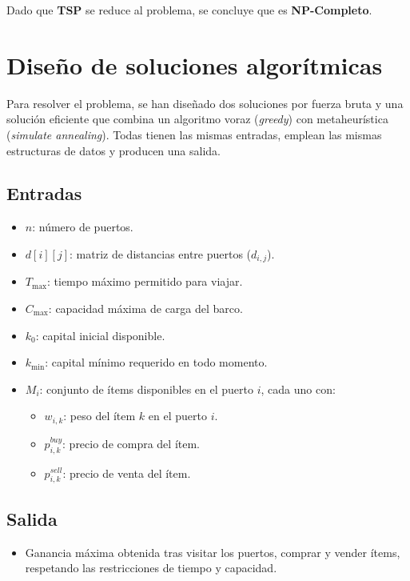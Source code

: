 \documentclass[12pt, a4paper]{article}
\begin{document}
Dado que \textbf{TSP} se reduce al problema, se concluye que es \textbf{NP-Completo}.

\section{Diseño de soluciones algorítmicas}

Para resolver el problema, se han diseñado dos soluciones por fuerza bruta y una solución eficiente que combina un algoritmo voraz (\textit{greedy}) con metaheurística (\textit{simulate annealing}). Todas tienen las mismas entradas, emplean las mismas estructuras de datos y producen una salida.

\subsection{Entradas}
\begin{itemize}
    \item $n$: número de puertos.
    \item $d[i][j]$: matriz de distancias entre puertos ($d_{i,j}$).
    \item $T_{\max}$: tiempo máximo permitido para viajar.
    \item $C_{\max}$: capacidad máxima de carga del barco.
    \item $k_0$: capital inicial disponible.
    \item $k_{\min}$: capital mínimo requerido en todo momento.
    \item $M_i$: conjunto de ítems disponibles en el puerto $i$, cada uno con:
    \begin{itemize}
        \item $w_{i,k}$: peso del ítem $k$ en el puerto $i$.
        \item $p_{i,k}^{buy}$: precio de compra del ítem.
        \item $p_{i,k}^{sell}$: precio de venta del ítem.
    \end{itemize}
\end{itemize}

\subsection{Salida}
\begin{itemize}
    \item Ganancia máxima obtenida tras visitar los puertos, comprar y vender ítems,
          respetando las restricciones de tiempo y capacidad.
\end{itemize}
\end{document}
